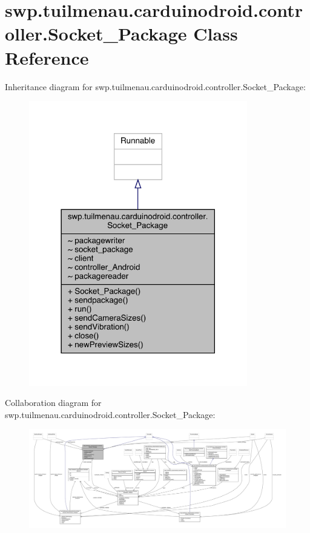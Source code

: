 \hypertarget{classswp_1_1tuilmenau_1_1carduinodroid_1_1controller_1_1_socket___package}{}\section{swp.\+tuilmenau.\+carduinodroid.\+controller.\+Socket\+\_\+\+Package Class Reference}
\label{classswp_1_1tuilmenau_1_1carduinodroid_1_1controller_1_1_socket___package}


Inheritance diagram for swp.\+tuilmenau.\+carduinodroid.\+controller.\+Socket\+\_\+\+Package\+:
\nopagebreak
\begin{figure}[H]
\begin{center}
\leavevmode
\includegraphics[width=270pt]{classswp_1_1tuilmenau_1_1carduinodroid_1_1controller_1_1_socket___package__inherit__graph}
\end{center}
\end{figure}


Collaboration diagram for swp.\+tuilmenau.\+carduinodroid.\+controller.\+Socket\+\_\+\+Package\+:
\nopagebreak
\begin{figure}[H]
\begin{center}
\leavevmode
\includegraphics[width=350pt]{classswp_1_1tuilmenau_1_1carduinodroid_1_1controller_1_1_socket___package__coll__graph}
\end{center}
\end{figure}
